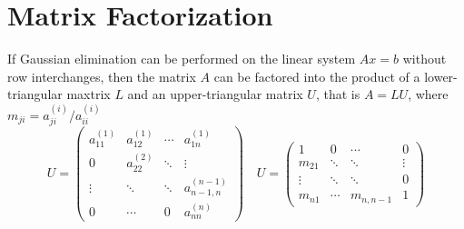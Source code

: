 \section{Matrix Factorization}
\begin{theo}
If Gaussian elimination can be performed on the linear system $Ax=b$ without row interchanges, then the matrix $A$ can be factored into the product of a lower-triangular maxtrix $L$ and an upper-triangular matrix $U$, that is $A=LU$, where $m_{ji}=a_{ji}^{(i)}/a_{ii}^{(i)}$
\[
U=
\begin{pmatrix}
a_{11}^{(1)} & a_{12}^{(1)} & \cdots       & a_{1n}^{(1)} \\
0            & a_{22}^{(2)} & \ddots       & \vdots       \\
\vdots       & \ddots       & \ddots       & a_{n-1,n}^{(n-1)} \\
0            & \cdots       & 0            & a_{nn}^{(n)}
\end{pmatrix}
\quad
U=
\begin{pmatrix}
1            & 0            & \cdots       & 0            \\
m_{21}       & \ddots       & \ddots       & \vdots       \\
\vdots       & \ddots       & \ddots       & 0            \\
m_{n1}       & \cdots       & m_{n,n-1}    & 1
\end{pmatrix}
\]
\end{theo}
